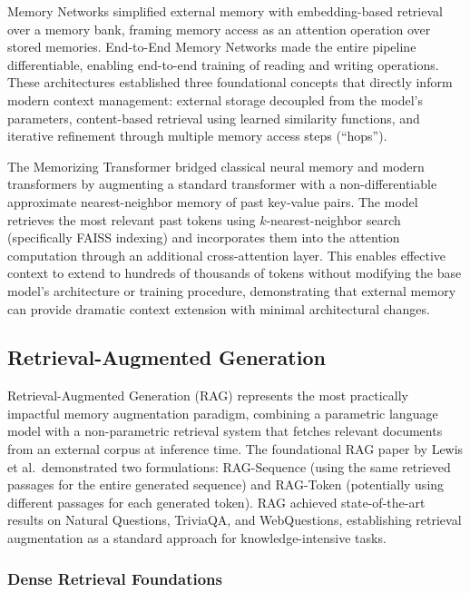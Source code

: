 \documentclass[11pt,letterpaper]{article}
\begin{document}
Memory Networks \cite{weston2015memory} simplified external memory with embedding-based retrieval over a memory bank, framing memory access as an attention operation over stored memories. End-to-End Memory Networks \cite{sukhbaatar2015end} made the entire pipeline differentiable, enabling end-to-end training of reading and writing operations. These architectures established three foundational concepts that directly inform modern context management: external storage decoupled from the model's parameters, content-based retrieval using learned similarity functions, and iterative refinement through multiple memory access steps (``hops'').

The Memorizing Transformer \cite{wu2022memorizing} bridged classical neural memory and modern transformers by augmenting a standard transformer with a non-differentiable approximate nearest-neighbor memory of past key-value pairs. The model retrieves the most relevant past tokens using $k$-nearest-neighbor search (specifically FAISS indexing) and incorporates them into the attention computation through an additional cross-attention layer. This enables effective context to extend to hundreds of thousands of tokens without modifying the base model's architecture or training procedure, demonstrating that external memory can provide dramatic context extension with minimal architectural changes.

\subsection{Retrieval-Augmented Generation}

Retrieval-Augmented Generation (RAG) \cite{lewis2020retrieval} represents the most practically impactful memory augmentation paradigm, combining a parametric language model with a non-parametric retrieval system that fetches relevant documents from an external corpus at inference time. The foundational RAG paper by Lewis et al.\ demonstrated two formulations: RAG-Sequence (using the same retrieved passages for the entire generated sequence) and RAG-Token (potentially using different passages for each generated token). RAG achieved state-of-the-art results on Natural Questions, TriviaQA, and WebQuestions, establishing retrieval augmentation as a standard approach for knowledge-intensive tasks.

\subsubsection{Dense Retrieval Foundations}
\end{document}
